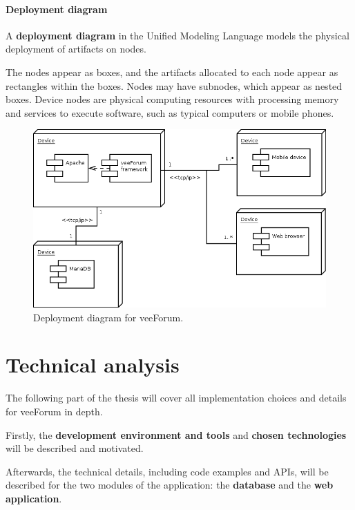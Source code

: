 \documentclass[12pt]{report}
\renewcommand\emph{\textbf}
\begin{document}
                    \newpage
                    \newpage

                \subsection{Deployment diagram}

                    A \emph{deployment diagram} in the Unified Modeling Language models the physical deployment of artifacts on nodes.

                    The nodes appear as boxes, and the artifacts allocated to each node appear as rectangles within the boxes. Nodes may have subnodes, which appear as nested boxes. Device nodes are physical computing resources with processing memory and services to execute software, such as typical computers or mobile phones. 

                    \begin{figure}[H]
                    \caption{Deployment diagram for veeForum.}
                    \centering
                    \includegraphics[width=1\textwidth]{deployment}
                    \end{figure}

    \part{Technical analysis}
        The following part of the thesis will cover all implementation choices and details for veeForum in depth.

        Firstly, the \emph{development environment and tools} and \emph{chosen technologies} will be described and motivated.

        Afterwards, the technical details, including code examples and APIs, will be described for the two modules of the application: the \emph{database} and the \emph{web application}.
\end{document}
